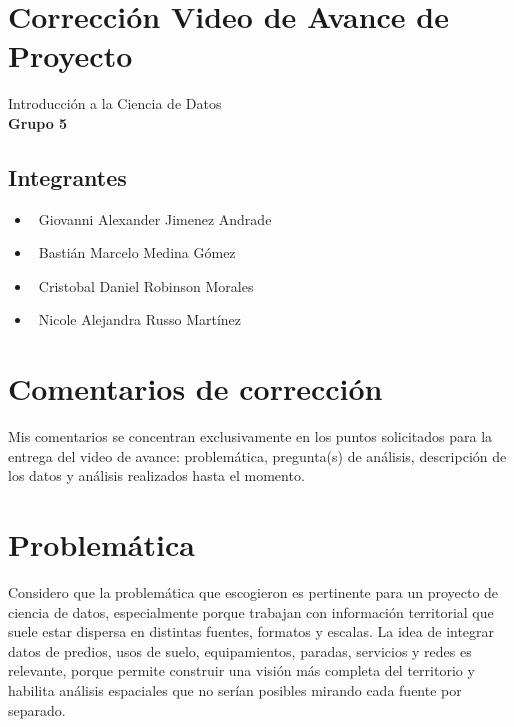 \documentclass[11pt]{article}
\begin{document}

\section*{\Huge Corrección Video de Avance de Proyecto}
\vspace{-0.5cm}

\begin{center}
\large Introducción a la Ciencia de Datos \\
\Large \textbf{Grupo 5}
\end{center}

\vspace{1cm}

\subsection*{Integrantes}
\begin{itemize}[leftmargin=*]
    \item \textbullet\ Giovanni Alexander Jimenez Andrade
    \item \textbullet\ Bastián Marcelo Medina Gómez
    \item \textbullet\ Cristobal Daniel Robinson Morales
    \item \textbullet\ Nicole Alejandra Russo Martínez
\end{itemize}

\vspace{1cm}

\section*{Comentarios de corrección}
\noindent Mis comentarios se concentran exclusivamente en los puntos solicitados para la entrega del video de avance: problemática, pregunta(s) de análisis, descripción de los datos y análisis realizados hasta el momento.

\vspace{0.5cm}

\section{Problemática}

Considero que la problemática que escogieron es pertinente para un proyecto de ciencia de datos, especialmente porque trabajan con información territorial que suele estar dispersa en distintas fuentes, formatos y escalas. La idea de integrar datos de predios, usos de suelo, equipamientos, paradas, servicios y redes es relevante, porque permite construir una visión más completa del territorio y habilita análisis espaciales que no serían posibles mirando cada fuente por separado.
\end{document}
